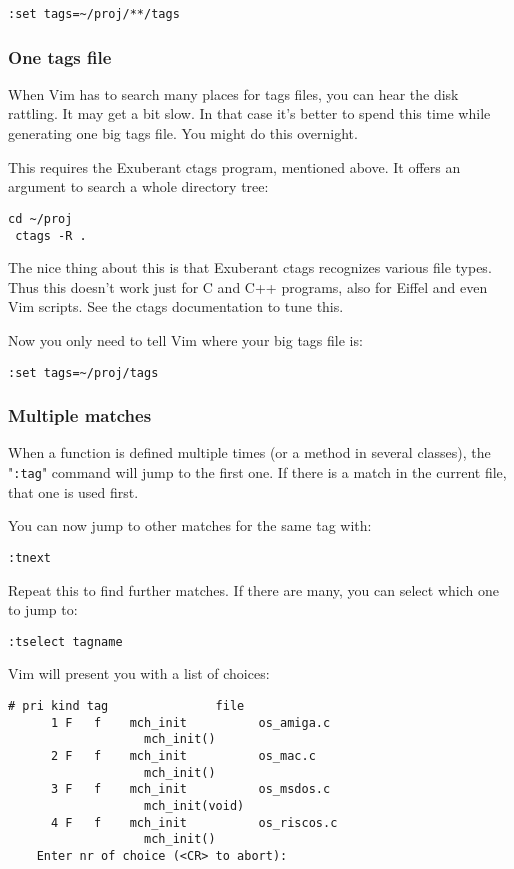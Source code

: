 \begin{Verbatim}[samepage=true]
 :set tags=~/proj/**/tags
\end{Verbatim}
\subsubsection{One tags file}
When Vim has to search many places for tags files, you can hear the disk rattling.
It may get a bit slow.
In that case it's better to spend this time while generating one big tags file.
You might do this overnight.

This requires the Exuberant ctags program, mentioned above.
It offers an argument to search a whole directory tree:

\begin{Verbatim}[samepage=true]
 cd ~/proj
 ctags -R .
\end{Verbatim}

The nice thing about this is that Exuberant ctags recognizes various file types.
Thus this doesn't work just for C and C++ programs, also for Eiffel and even Vim scripts.
See the ctags documentation to tune this.

Now you only need to tell Vim where your big tags file is:

\begin{Verbatim}[samepage=true]
 :set tags=~/proj/tags
\end{Verbatim}
\subsubsection{Multiple matches}
When a function is defined multiple times (or a method in several classes), the "\texttt{:tag}" command will jump to the first one.
If there is a match in the current file, that one is used first.

You can now jump to other matches for the same tag with:

\begin{Verbatim}[samepage=true]
 :tnext
\end{Verbatim}

Repeat this to find further matches.
If there are many, you can select which one to jump to:

\begin{Verbatim}[samepage=true]
 :tselect tagname
\end{Verbatim}

Vim will present you with a list of choices:

\begin{Verbatim}[samepage=true]
      # pri kind tag               file 
      1 F   f    mch_init          os_amiga.c 
                   mch_init() 
      2 F   f    mch_init          os_mac.c 
                   mch_init() 
      3 F   f    mch_init          os_msdos.c 
                   mch_init(void) 
      4 F   f    mch_init          os_riscos.c 
                   mch_init() 
    Enter nr of choice (<CR> to abort):  
\end{Verbatim}

